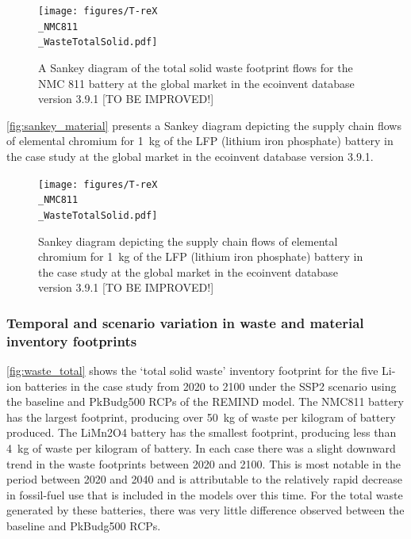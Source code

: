 \begin{figure}[H]
    \centering
    \texttt{[image: figures/T-reX\\\_NMC811\\\_WasteTotalSolid.pdf]}
    \caption{A Sankey diagram of the total solid waste footprint flows for the NMC 811 battery at the global market in the ecoinvent database version 3.9.1 [TO BE IMPROVED!]}\label{fig:sankey_waste}
\end{figure}

\autoref{fig:sankey_material} presents a Sankey diagram depicting the supply chain flows of elemental chromium for 1~kg of the LFP (lithium iron phosphate) battery in the case study at the global market in the ecoinvent database version 3.9.1. 

\begin{figure}[H]
    \centering
    \texttt{[image: figures/T-reX\\\_NMC811\\\_WasteTotalSolid.pdf]}
    \caption{Sankey diagram depicting the supply chain flows of elemental chromium for 1~kg of the LFP (lithium iron phosphate) battery in the case study at the global market in the ecoinvent database version 3.9.1 [TO BE IMPROVED!]}\label{fig:sankey_material}
\end{figure}


\subsubsection{Temporal and scenario variation in waste and material inventory footprints}\label{sec:results-case_study-total_footprints}

\autoref{fig:waste_total} shows the `total solid waste' inventory footprint for the five Li-ion batteries in the case study from 2020 to 2100 under the SSP2 scenario using the baseline and PkBudg500 RCPs of the REMIND model. The NMC811 battery has the largest footprint, producing over 50~kg of waste per kilogram of battery produced. The LiMn2O4 battery has the smallest footprint, producing less than 4~kg of waste per kilogram of battery. In each case there was a slight downward trend in the waste footprints between 2020 and 2100. This is most notable in the period between 2020 and 2040 and is attributable to the relatively rapid decrease in fossil-fuel use that is included in the models over this time. For the total waste generated by these batteries, there was very little difference observed between the baseline and PkBudg500 RCPs.

